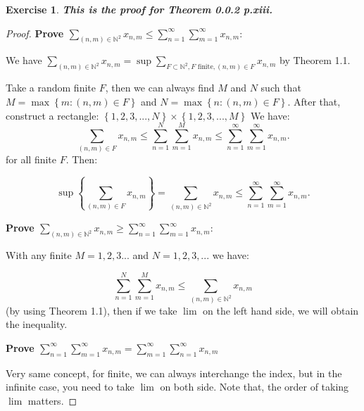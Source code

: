 \documentclass[11pt,a4paper]{article}
\theoremstyle{definition}
\newtheorem{exercise}[definition]{Exercise}
\theoremstyle{plain}
\newcommand{\N}{\mathbb{N}}
\newcommand{\set}[1]{\left\{#1\right\}}
\begin{document}
\begin{exercise}

\textbf{\textit{This is the proof for Theorem 0.0.2 p.xiii.}}
\begin{proof}
\textbf{Prove $\sum_{(n,m)\in \N^2}x_{n,m}\le \sum_{n=1}^{\infty}\sum_{m=1}^{\infty}x_{n,m}$}:

We have $\sum_{(n,m)\in \N^2}x_{n,m} = \sup{\sum_{F\subset \N^2, F \text{ finite}, (n,m)\in F}x_{n,m}}$ by Theorem 1.1.

Take a random finite $F$, then we can always find $M$ and $N$ such that $M= \max\set{m:(n,m)\in F}$ and $N= \max\set{n:(n,m)\in F}$. After that, construct a rectangle: $\set{1,2,3,...,N} \times \set{1,2,3,...,M}$ We have:
\[
\sum_{(n,m)\in F}x_{n,m} \le \sum_{n=1}^{N}\sum_{m=1}^{M}x_{n,m} \le \sum_{n=1}^{\infty}\sum_{m=1}^{\infty}x_{n,m}.
\]
for all finite $F$. Then:

\[
\sup\set{\sum_{(n,m)\in F}x_{n,m}} = \sum_{(n,m)\in \N^2}x_{n,m}  \le \sum_{n=1}^{\infty}\sum_{m=1}^{\infty}x_{n,m}.
\]


\textbf{Prove $\sum_{(n,m)\in \N^2}x_{n,m}\ge \sum_{n=1}^{\infty}\sum_{m=1}^{\infty}x_{n,m}$}:

With any finite $M = 1,2,3...$ and $N = 1,2,3,...$ we have:

\[
\sum_{n=1}^{N}\sum_{m=1}^{M}x_{n,m} \le \sum_{(n,m)\in \N^2}x_{n,m} 
\]
(by using Theorem 1.1), then if we take $\lim$ on the left hand side, we will obtain the inequality.

\textbf{Prove $\sum_{n=1}^{\infty}\sum_{m=1}^{\infty}x_{n,m} = \sum_{m=1}^{\infty}\sum_{n=1}^{\infty}x_{n,m}$}

Very same concept, for finite, we can always interchange the index, but in the infinite case, you need to take $\lim$ on both side. Note that, the order of taking $\lim$ matters.
\end{proof}


\end{exercise}
\end{document}
